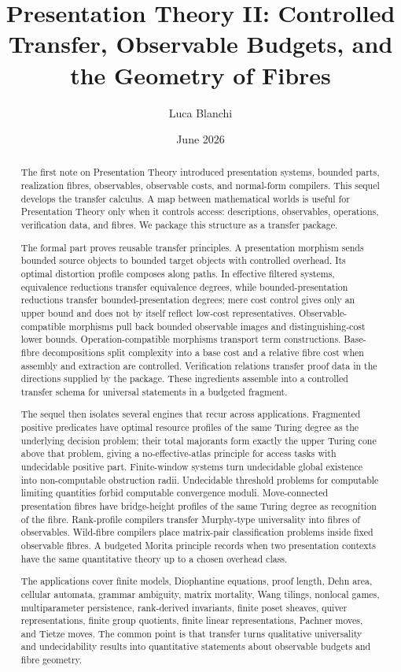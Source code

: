 \documentclass[11pt]{article}
\title{Presentation Theory II: Controlled Transfer, Observable Budgets, and the Geometry of Fibres}
\author{Luca Blanchi}
\date{June 2026}
\begin{document}
\maketitle

\begin{abstract}
The first note on Presentation Theory introduced presentation systems, bounded parts, realization fibres, observables, observable costs, and normal-form compilers. This sequel develops the transfer calculus. A map between mathematical worlds is useful for Presentation Theory only when it controls access: descriptions, observables, operations, verification data, and fibres. We package this structure as a transfer package.

The formal part proves reusable transfer principles. A presentation morphism sends bounded source objects to bounded target objects with controlled overhead. Its optimal distortion profile composes along paths. In effective filtered systems, equivalence reductions transfer equivalence degrees, while bounded-presentation reductions transfer bounded-presentation degrees; mere cost control gives only an upper bound and does not by itself reflect low-cost representatives. Observable-compatible morphisms pull back bounded observable images and distinguishing-cost lower bounds. Operation-compatible morphisms transport term constructions. Base-fibre decompositions split complexity into a base cost and a relative fibre cost when assembly and extraction are controlled. Verification relations transfer proof data in the directions supplied by the package. These ingredients assemble into a controlled transfer schema for universal statements in a budgeted fragment.

The sequel then isolates several engines that recur across applications. Fragmented positive predicates have optimal resource profiles of the same Turing degree as the underlying decision problem; their total majorants form exactly the upper Turing cone above that problem, giving a no-effective-atlas principle for access tasks with undecidable positive part. Finite-window systems turn undecidable global existence into non-computable obstruction radii. Undecidable threshold problems for computable limiting quantities forbid computable convergence moduli. Move-connected presentation fibres have bridge-height profiles of the same Turing degree as recognition of the fibre. Rank-profile compilers transfer Murphy-type universality into fibres of observables. Wild-fibre compilers place matrix-pair classification problems inside fixed observable fibres. A budgeted Morita principle records when two presentation contexts have the same quantitative theory up to a chosen overhead class.

The applications cover finite models, Diophantine equations, proof length, Dehn area, cellular automata, grammar ambiguity, matrix mortality, Wang tilings, nonlocal games, multiparameter persistence, rank-derived invariants, finite poset sheaves, quiver representations, finite group quotients, finite linear representations, Pachner moves, and Tietze moves. The common point is that transfer turns qualitative universality and undecidability results into quantitative statements about observable budgets and fibre geometry.
\end{abstract}
\end{document}
